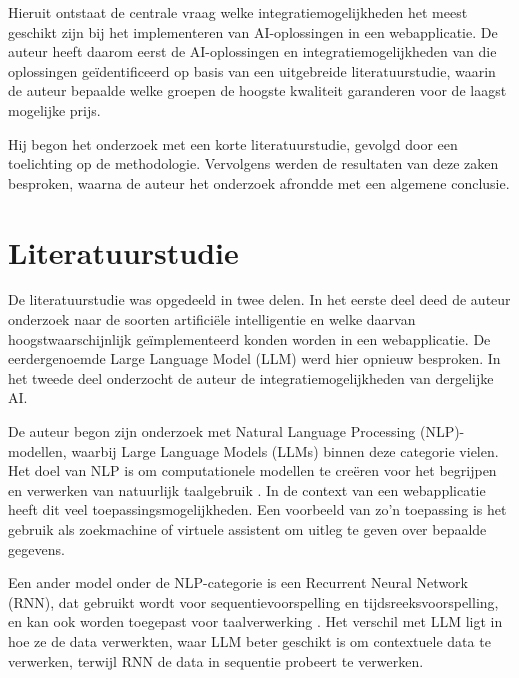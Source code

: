 \documentclass[dutch]{hogent-article}
\begin{document}
  Hieruit ontstaat de centrale vraag welke integratiemogelijkheden het meest geschikt zijn bij het implementeren van AI-oplossingen in een webapplicatie. De auteur heeft daarom eerst de AI-oplossingen en integratiemogelijkheden van die oplossingen geïdentificeerd op basis van een uitgebreide literatuurstudie, waarin de auteur bepaalde welke groepen de hoogste kwaliteit garanderen voor de laagst mogelijke prijs.
  
  Hij begon het onderzoek met een korte literatuurstudie, gevolgd door een toelichting op de methodologie. Vervolgens werden de resultaten van deze zaken besproken, waarna de auteur het onderzoek afrondde met een algemene conclusie.
  

\section{Literatuurstudie}%
\label{sec:literature review}


De literatuurstudie was opgedeeld in twee delen. In het eerste deel deed de auteur onderzoek naar de soorten artificiële intelligentie en welke daarvan hoogstwaarschijnlijk geïmplementeerd konden worden in een webapplicatie. De eerdergenoemde Large Language Model (LLM) werd hier opnieuw besproken. In het tweede deel onderzocht de auteur de integratiemogelijkheden van dergelijke AI.

De auteur begon zijn onderzoek met Natural Language Processing (NLP)-modellen, waarbij Large Language Models (LLMs) binnen deze categorie vielen. Het doel van NLP is om computationele modellen te creëren voor het begrijpen en verwerken van natuurlijk taalgebruik \autocite{Bharati2002}. In de context van een webapplicatie heeft dit veel toepassingsmogelijkheden. Een voorbeeld van zo'n toepassing is het gebruik als zoekmachine of virtuele assistent om uitleg te geven over bepaalde gegevens.

Een ander model onder de NLP-categorie is een Recurrent Neural Network (RNN), dat gebruikt wordt voor sequentievoorspelling en tijdsreeksvoorspelling, en kan ook worden toegepast voor taalverwerking \autocite{IBMRNN2023}. Het verschil met LLM ligt in hoe ze de data verwerkten, waar LLM beter geschikt is om contextuele data te verwerken, terwijl RNN de data in sequentie probeert te verwerken.
\end{document}
